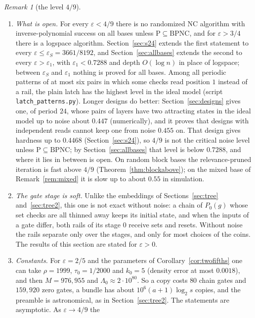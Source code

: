 \documentclass[11pt]{amsart}
\theoremstyle{definition}
\theoremstyle{remark}
\newtheorem{remark}[theorem]{Remark}
\newcommand{\eps}{\varepsilon}
\begin{document}
\begin{remark}[the level $4/9$]
\begin{enumerate}[label=(\roman*),leftmargin=2.4em]
here it makes a difference between the rails grow. Also $\pi_0=q/(1+q)$ is the density of ones
of such blocks. This is an explanation of the coincidence, not a theorem that relates the two
statements.
\item \emph{What is open.} For every $\eps<4/9$ there is no randomized NC algorithm with
inverse-polynomial success on all bases unless $\mathrm P\subseteq\mathrm{BPNC}$, and for
$\eps>3/4$ there is a logspace algorithm. Section~\ref{sec:s24} extends the first statement to
every $\eps\le\eps_S=3661/8192$, and Section~\ref{sec:allbases} extends the second to every
$\eps>\eps_1$, with $\eps_1<0.7288$ and depth $O(\log n)$ in place of logspace; between $\eps_S$ and
$\eps_1$ nothing is proved for all bases.
Among all periodic patterns of at most six pairs in which some checks read position $1$ instead
of a rail, the plain latch has the highest level in the ideal model (script
\texttt{latch\_patterns.py}). Longer designs do better: Section~\ref{sec:designs} gives one, of
period $24$, whose pairs of layers have two attracting states in the ideal model up to noise about
$0.447$ (numerically), and it proves that designs with independent reads cannot keep one from noise $0.455$ on. That
design gives hardness up to $0.4468$ (Section~\ref{sec:s24}), so $4/9$ is not the critical noise
level unless $\mathrm P\subseteq\mathrm{BPNC}$; by Section~\ref{sec:allbases} that level is below
$0.7288$, and where it lies in between is open. On random block bases the relevance-pruned
iteration is fast above $4/9$ (Theorem~\ref{thm:blockabove}); on the mixed base of
Remark~\ref{rem:mixed} it is slow up to about $0.55$ in simulation.
\item \emph{The gate stage is soft.} Unlike the embeddings of Sections~\ref{sec:tree}
and~\ref{sec:tree2}, this one is not exact without noise: a chain of $P_0(g)$ whose set checks are
all thinned away keeps its initial state, and when the inputs of a gate differ, both rails of its
stage $0$ receive sets and resets. Without noise the rails separate only over the stages, and only
for most choices of the coins. The results of this section are stated for $\eps>0$.
\item \emph{Constants.} For $\eps=2/5$ and the parameters of Corollary~\ref{cor:twofifths} one can
take $\rho=1999$, $\tau_0=1/2000$ and $k_0=5$ (density error at most $0.0018$), and then
$M=976{,}955$ and $\Lambda_0\approx2\cdot10^{80}$. So a copy costs $80$ chain gates and
$159{,}920$ zero gates, a bundle has about $10^6(a+1)\log_2s$ copies, and the preamble is
astronomical, as in Section~\ref{sec:tree2}. The statements are asymptotic. As $\eps\to4/9$ the

\end{enumerate}
\end{remark}
\end{document}

